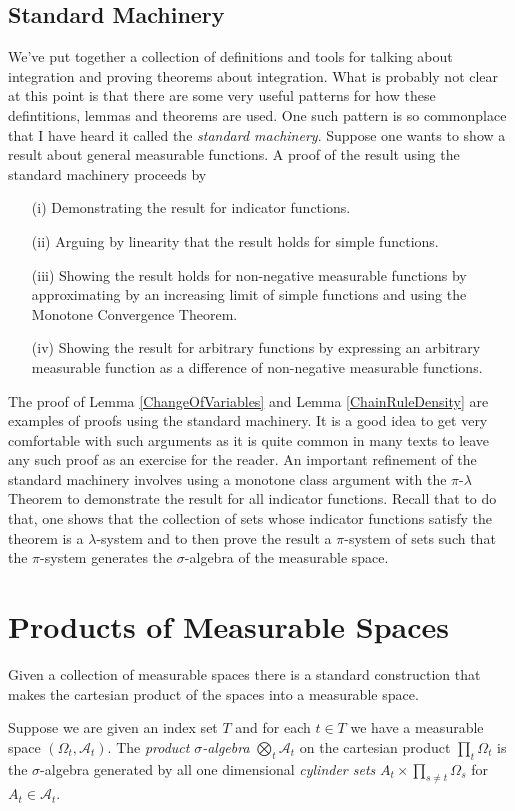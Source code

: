 \subsection{Standard Machinery}
We've put together a collection of definitions and tools for
talking about integration and proving theorems about integration.
What is probably not clear at this point is that there are some very
useful patterns for how these defintitions, lemmas and theorems are
used.  One such pattern is so commonplace that I have heard it called
the \emph{standard machinery}.  
Suppose one wants to show a result about general measurable
functions.  A proof of the result using the standard machinery proceeds by 
\begin{itemize}
\item[(i)]Demonstrating the result for indicator functions.
\item[(ii)]Arguing by linearity that the result holds for simple functions.
\item[(iii)]Showing the result holds for non-negative measurable
  functions by approximating by an increasing limit of simple
  functions and using the Monotone Convergence Theorem.
\item[(iv)]Showing the result for arbitrary functions by expressing an
  arbitrary measurable function as a difference of non-negative
  measurable functions.
\end{itemize}
The proof of Lemma \ref{ChangeOfVariables} and Lemma
\ref{ChainRuleDensity} are examples of proofs
using the standard machinery.  It is a good idea to get very
comfortable with such arguments as it is quite common in many texts to
leave any such proof as an exercise for the reader.  An important refinement of the standard machinery involves using a
monotone class argument with the $\pi$-$\lambda$ Theorem to demonstrate the result for all indicator
functions.  Recall that to do that, one shows that the collection of
sets whose indicator functions satisfy the theorem is a
$\lambda$-system and to then prove the result a $\pi$-system of sets
such that the $\pi$-system generates the $\sigma$-algebra of the
measurable space.
\section{Products of Measurable Spaces}

Given a collection of measurable spaces there is a standard
construction that makes the cartesian product of the spaces into a
measurable space.
\begin{defn}Suppose we are given an index set $T$ and for each $t \in
  T$ we have a measurable space $(\Omega_t, \mathcal{A}_t)$.  The
  \emph{product} $\sigma$\emph{-algebra} $\bigotimes_t \mathcal{A}_t$ on the cartesian product
  $\prod_t \Omega_t$ is the $\sigma$-algebra
  generated by all one dimensional \emph{cylinder sets} $A_t \times
  \prod_{s \neq t} \Omega_s$ for $A_t \in \mathcal{A}_t$.
\end{defn}

